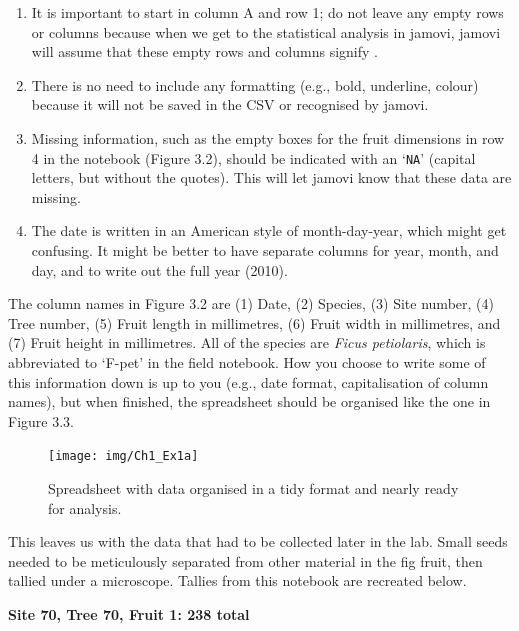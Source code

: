 \documentclass[
  openany]{krantz}
\providecommand{\tightlist}{%
  \setlength{\itemsep}{0pt}\setlength{\parskip}{0pt}}
\begin{document}
\begin{enumerate}
\def\labelenumi{\arabic{enumi}.}
\tightlist
\item
  It is important to start in column A and row 1; do not leave any empty rows or columns because when we get to the statistical analysis in jamovi, jamovi will assume that these empty rows and columns signify .
\item
  There is no need to include any formatting (e.g., bold, underline, colour) because it will not be saved in the CSV or recognised by jamovi.
\item
  Missing information, such as the empty boxes for the fruit dimensions in row 4 in the notebook (Figure 3.2), should be indicated with an `\texttt{NA}' (capital letters, but without the quotes). This will let jamovi know that these data are missing.
\item
  The date is written in an American style of month-day-year, which might get confusing. It might be better to have separate columns for year, month, and day, and to write out the full year (2010).
\end{enumerate}

The column names in Figure 3.2 are (1) Date, (2) Species, (3) Site number, (4) Tree number, (5) Fruit length in millimetres, (6) Fruit width in millimetres, and (7) Fruit height in millimetres.
All of the species are \emph{Ficus petiolaris}, which is abbreviated to `F-pet' in the field notebook.
How you choose to write some of this information down is up to you (e.g., date format, capitalisation of column names), but when finished, the spreadsheet should be organised like the one in Figure 3.3.

\begin{figure}
\texttt{[image: img/Ch1\_Ex1a]} \caption{Spreadsheet with data organised in a tidy format and nearly ready for analysis.}\label{fig:unnamed-chunk-12}
\end{figure}

This leaves us with the data that had to be collected later in the lab.
Small seeds needed to be meticulously separated from other material in the fig fruit, then tallied under a microscope.
Tallies from this notebook are recreated below.

\textbf{Site 70, Tree 70, Fruit 1: 238 total}

\StrokeFive\StrokeFive\StrokeFive\StrokeFive\StrokeFive\StrokeFive\StrokeFive\StrokeFive\StrokeFive\StrokeFive\StrokeFive\StrokeFive\StrokeFive\StrokeFive\StrokeFive\StrokeFive\StrokeFive\StrokeFive\StrokeFive\StrokeFive
\end{document}
